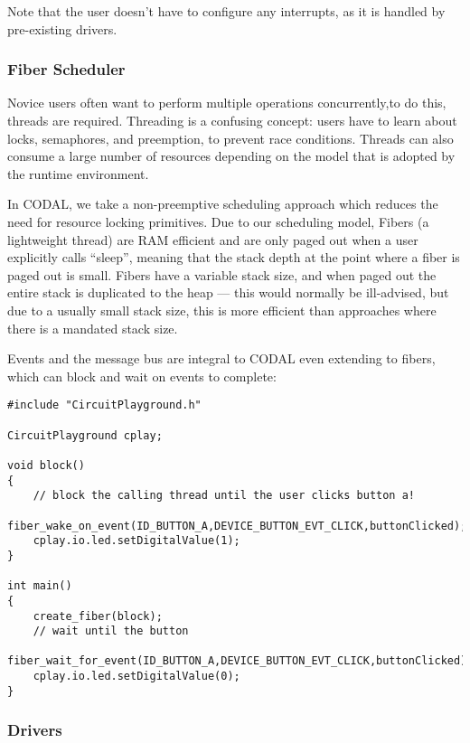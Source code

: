 Note that the user doesn't have to configure any interrupts, as it is handled by pre-existing drivers.


\subsubsection{Fiber Scheduler}

Novice users often want to perform multiple operations concurrently,to do this, threads are required. Threading is a confusing concept: users have to learn about locks, semaphores, and preemption, to prevent race conditions. Threads can also consume a large number of resources depending on the model that is adopted by the runtime environment.

In CODAL, we take a non-preemptive scheduling approach which reduces the need for resource locking primitives. Due to our scheduling model, Fibers (a lightweight thread) are RAM efficient and are only paged out when a user explicitly calls ``sleep'', meaning that the stack depth at the point where a fiber is paged out is small. Fibers have a variable stack size, and when paged out the entire stack is duplicated to the heap --- this would normally be ill-advised, but due to a usually small stack size, this is more efficient than approaches where there is a mandated stack size.

Events and the message bus are integral to CODAL even extending to fibers, which can block and wait on events to complete:

\begin{lstlisting}
#include "CircuitPlayground.h"

CircuitPlayground cplay;

void block()
{
    // block the calling thread until the user clicks button a!
    fiber_wake_on_event(ID_BUTTON_A,DEVICE_BUTTON_EVT_CLICK,buttonClicked);
    cplay.io.led.setDigitalValue(1);
}

int main()
{
    create_fiber(block);
    // wait until the button
    fiber_wait_for_event(ID_BUTTON_A,DEVICE_BUTTON_EVT_CLICK,buttonClicked);
    cplay.io.led.setDigitalValue(0);
}
\end{lstlisting}

\subsubsection{Drivers}

